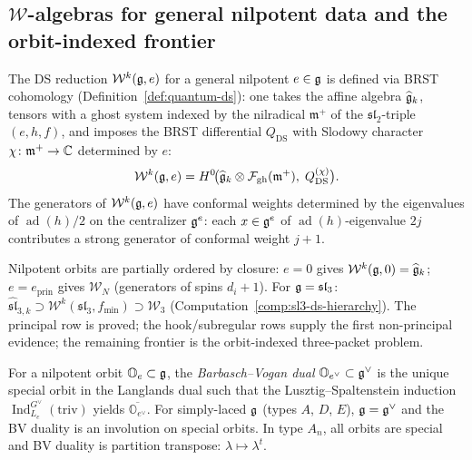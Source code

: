 \subsection{$\mathcal{W}$-algebras for general nilpotent data and the orbit-indexed frontier}
\label{sec:general-nilpotent-duality}

The DS reduction $\mathcal{W}^k(\mathfrak{g}, e)$ for a general nilpotent
$e \in \mathfrak{g}$ is defined via BRST cohomology
(Definition~\ref{def:quantum-ds}): one takes the affine algebra
$\widehat{\mathfrak{g}}_k$, tensors with a ghost system indexed by the nilradical
$\mathfrak{m}^+$ of the $\mathfrak{sl}_2$-triple $(e, h, f)$, and
imposes the BRST differential $Q_{\mathrm{DS}}$ with Slodowy character
$\chi \colon \mathfrak{m}^+ \to \mathbb{C}$ determined by $e$:
\begin{equation}\label{eq:general-ds}
\mathcal{W}^k(\mathfrak{g}, e) = H^0\!\bigl(
\widehat{\mathfrak{g}}_k \otimes \mathcal{F}_{\mathrm{gh}}(\mathfrak{m}^+),\;
Q_{\mathrm{DS}}^{(\chi)}\bigr).
\end{equation}
The generators of $\mathcal{W}^k(\mathfrak{g}, e)$ have conformal weights
determined by the eigenvalues of $\operatorname{ad}(h)/2$ on the
centralizer $\mathfrak{g}^e$: each $x \in \mathfrak{g}^e$ of $\operatorname{ad}(h)$-eigenvalue
$2j$ contributes a strong generator of conformal weight $j + 1$.

\begin{remark}
\label{rem:ds-hierarchy-summary}
Nilpotent orbits are partially ordered by closure: $e = 0$ gives $\mathcal{W}^k(\mathfrak{g}, 0) = \widehat{\mathfrak{g}}_k$; $e = e_{\mathrm{prin}}$ gives $\mathcal{W}_N$ (generators of spins $d_i + 1$).  For $\mathfrak{g} = \mathfrak{sl}_3$: $\widehat{\mathfrak{sl}}_{3,k} \supset \mathcal{W}^k(\mathfrak{sl}_3, f_{\min}) \supset \mathcal{W}_3$ (Computation~\ref{comp:sl3-ds-hierarchy}).  The principal row is proved; the hook/subregular rows supply the first non-principal evidence; the remaining frontier is the orbit-indexed three-packet problem.
\end{remark}

\begin{definition}
\label{def:bv-dual}
For a nilpotent orbit $\mathbb{O}_e \subset \mathfrak{g}$, the
\emph{Barbasch--Vogan dual} $\mathbb{O}_{e^\vee} \subset \mathfrak{g}^\vee$ is
the unique special orbit in the Langlands dual such that
the Lusztig--Spaltenstein induction
$\operatorname{Ind}_{L_e}^{G^\vee}(\mathrm{triv})$ yields
$\overline{\mathbb{O}_{e^\vee}}$.  For simply-laced $\mathfrak{g}$
(types $A$, $D$, $E$), $\mathfrak{g} = \mathfrak{g}^\vee$ and the BV duality is an
involution on special orbits.  In type $A_n$, all orbits are special
and BV duality is partition transpose: $\lambda \mapsto \lambda^t$.
\end{definition}

